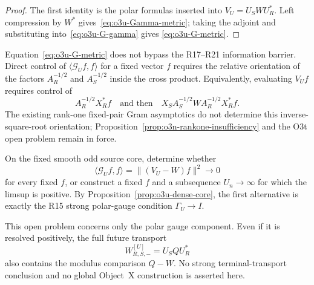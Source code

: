 \begin{proof}
The first identity is the polar formulas inserted into
$V_U=U_SWU_R^*$.  Left compression by $W^*$ gives~\eqref{eq:o3u-Gamma-metric}; taking
the adjoint and substituting into~\eqref{eq:o3u-G-gamma} gives
\eqref{eq:o3u-G-metric}.
\end{proof}

\begin{remark}
\label{rem:o3u-inverse-root-firewall}
Equation~\eqref{eq:o3u-G-metric} does not bypass the R17--R21 information barrier.
Direct control of $\langle\mathscr G_Uf,f\rangle$ for a fixed vector $f$ requires the
relative orientation of the factors $A_R^{-1/2}$ and $A_S^{-1/2}$ inside the cross
product.  Equivalently, evaluating $V_Uf$ requires control of
\[
 A_R^{-1/2}X_R^*f
 \quad\text{and then}\quad
 X_SA_S^{-1/2}W A_R^{-1/2}X_R^*f.
\]
The existing rank-one fixed-pair Gram asymptotics do not determine this inverse-square-root
orientation; Proposition~\ref{prop:o3n-rankone-insufficiency} and the O3t open problem
remain in force.
\end{remark}

\begin{openproblem}
\label{open:o3u-angle-defect}
On the fixed smooth odd source core, determine whether
\[
 \boxed{
 \langle\mathscr G_Uf,f\rangle
 =\|(V_U-W)f\|^2
 \longrightarrow0
 }
\tag{O3U.14}\label{eq:o3u-open-target}
\]
for every fixed $f$, or construct a fixed $f$ and a subsequence $U_n\to\infty$ for
which the limsup is positive.  By Proposition~\ref{prop:o3u-dense-core}, the first
alternative is exactly the R15 strong polar-gauge condition
$\Gamma_U\to I$.

This open problem concerns only the polar gauge component.  Even if it is resolved
positively, the full future transport
\[
 W_{R,S,-}^{[U]}=U_SQU_R^*
\]
also contains the modulus comparison $Q-W$.  No strong terminal-transport conclusion
and no global Object~X construction is asserted here.
\end{openproblem}

